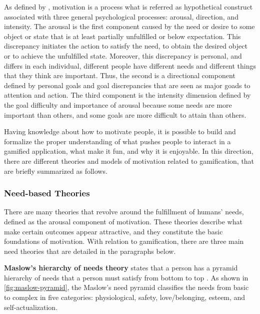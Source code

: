 As defined by , motivation is a process what is referred as hypothetical construct associated with three general psychological processes: arousal, direction, and intensity.
The arousal is the first component caused by the need or desire to some object or state that is at least partially unfulfilled or below expectation.
This discrepancy initiates the action to satisfy the need, to obtain the desired object or to achieve the unfulfilled state. Moreover, this discrepancy is personal, and differs in each individual, different people have different needs and different things that they think are important. Thus, the second is a directional component defined by personal goals and goal discrepancies that are seen as major goads to attention and action. The third component is the intensity dimension defined by the goal difficulty and importance of arousal because some needs are more
important than others, and some goals are more difficult to attain
than others.

Having knowledge about how to motivate people, it is possible to build and formalize the proper understanding of what pushes people to interact in a gamified application, what make it fun, and why it is enjoyable. In this direction, there are different theories and models of motivation related to gamification, that are briefly summarized as follows. 

\subsubsection{Need-based Theories}
\label{subsubsec:need-theories}

There are many theories that revolve around the fulfillment of humans' needs, defined as the arousal component of motivation. 
These theories describe what make certain outcomes appear attractive, and they constitute the basic foundations of motivation. 
With relation to gamification, there are three main need theories that are detailed in the paragraphs below.

\textbf{Maslow's hierarchy of needs theory} states that a person has a pyramid hierarchy of needs that a person must satisfy from bottom to top \cite{Maslow1954,Goble1970}. As shown in \autoref{fig:maslow-pyramid}, the Maslow's need pyramid classifies the needs from basic to complex in five categories: physiological, safety, love/belonging, esteem, and self-actualization.

